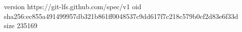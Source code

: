 version https://git-lfs.github.com/spec/v1
oid sha256:ec855a491499957db321b861ff0048537c9dd617f7c218c579b0cf2d83e6f33d
size 235169
